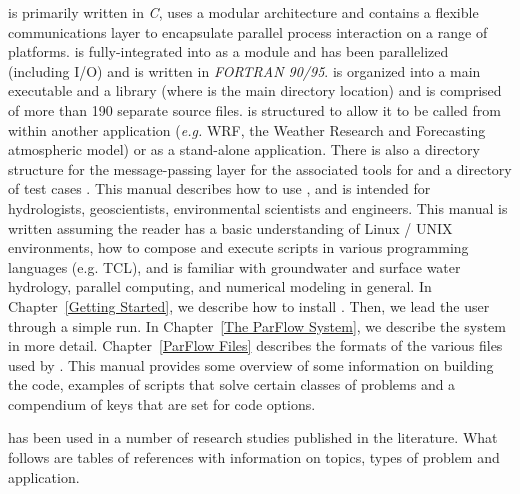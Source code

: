 \parflow{} is primarily written in \emph{C}, uses a modular
architecture and contains a flexible communications layer to
encapsulate parallel process interaction on a range of platforms.
 is fully-integrated into \parflow{} as a module and has
been parallelized (including I/O) and is written in \emph{FORTRAN
  90/95}.  \parflow{} is organized into a main executable
 and a library
 (where  is
the main directory location) and is comprised of more than 190
separate source files.  \parflow{} is structured to allow it to be
called from within another application (\emph{e.g.} WRF, the Weather Research 
and Forecasting atmospheric model) or as a
stand-alone application.  There is also a directory structure for the
message-passing layer  for the
associated tools  for 
 and a directory of test cases
.
This manual describes how to use \parflow{}, and is intended for
hydrologists, geoscientists, environmental scientists and engineers. 
This manual is written assuming the reader has a basic understanding
of Linux / UNIX environments, how to compose and execute scripts in various 
programming languages (e.g. TCL), and is familiar with groundwater and 
surface water hydrology, parallel computing, and numerical modeling in general.
In Chapter~\ref{Getting Started}, we describe how to install \parflow{}.
Then, we lead the user through a simple \parflow{} run.  In
Chapter~\ref{The ParFlow System}, we describe the \parflow{} system in
more detail.  Chapter~\ref{ParFlow Files} describes the formats of the
various files used by \parflow{}.  This manual provides some overview of \parflow{}
some information on building the code, examples of scripts that solve certain classes of
problems and a compendium of keys that are set for code options. 

\parflow{} has been used in a number of research studies published in the literature. 
What follows are tables of \parflow{} references with information on topics, types of problem and
application. \\
\newpage

